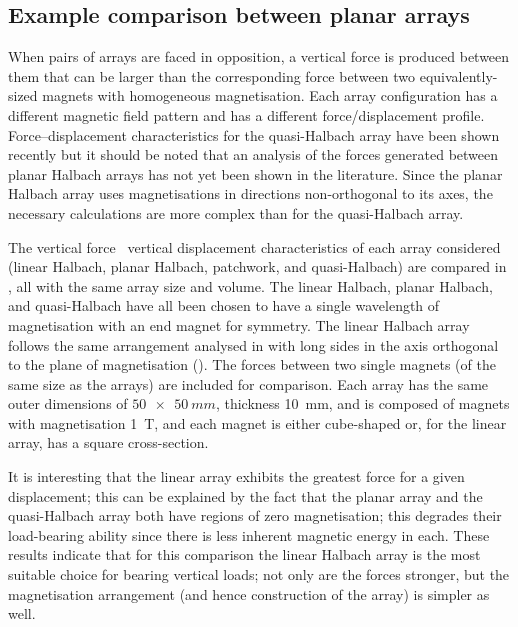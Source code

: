 \documentclass[11pt,a4paper]{memoir}
\begin{document}
\subsection{Example comparison between planar arrays}

When pairs of arrays are faced in opposition, a vertical force is produced between them that can be larger than the corresponding force between two equivalently-sized magnets with homogeneous magnetisation.
Each array configuration has a different magnetic field pattern and has a different force/displacement profile.
Force--displacement characteristics for the quasi-Halbach array have been shown recently \cite{janssen2009-jsdd} but it should be noted that an analysis of the forces generated between planar Halbach arrays has not yet been shown in the literature.
Since the planar Halbach array uses magnetisations in directions non-orthogonal to its axes, the necessary calculations are more complex than for the quasi-Halbach array.

The vertical force \vs\ vertical displacement characteristics of each array considered (linear Halbach, planar Halbach, patchwork, and quasi-Halbach) are compared in , all with the same array size and volume.
The linear Halbach, planar Halbach, and quasi-Halbach have all been chosen to have a single wavelength of magnetisation with an end magnet for symmetry.
The linear Halbach array follows the same arrangement analysed in  with long sides in the axis orthogonal to the plane of magnetisation ().
The forces between two single magnets (of the same size as the arrays) are included for comparison.
Each array has the same outer dimensions of $\SI{50x50}{mm}$, thickness \SI{10}{mm}, and is composed of magnets with magnetisation \SI{1}{T}, and each magnet is either cube-shaped or, for the linear array, has a square cross-section.

It is interesting that the linear array exhibits the greatest force for a given displacement; this can be explained by the fact that the planar array and the quasi-Halbach array both have regions of zero magnetisation; this degrades their load-bearing ability since there is less inherent magnetic energy in each.
These results indicate that for this comparison the linear Halbach array is the most suitable choice for bearing vertical loads; not only are the forces stronger, but the magnetisation arrangement (and hence construction of the array) is simpler as well.
\end{document}
